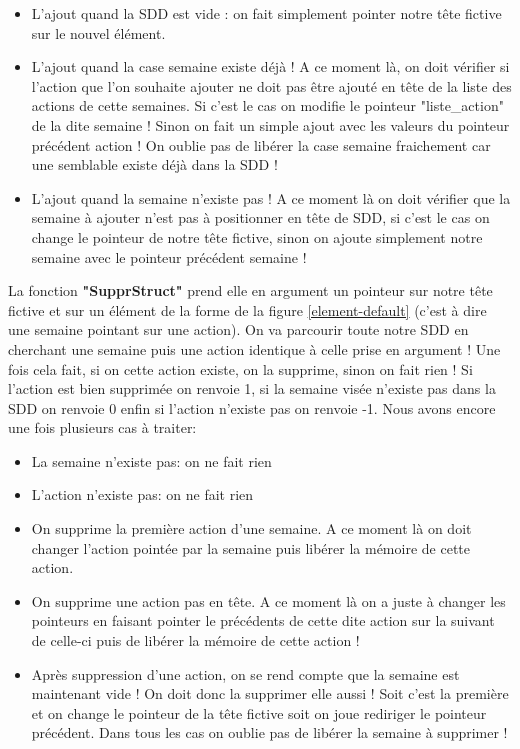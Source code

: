 \documentclass[12pt,french]{article} %
\begin{document}
\begin{itemize}
	\item L'ajout quand la SDD est vide : on fait simplement pointer notre tête fictive sur le nouvel élément.
	\item L'ajout quand la case semaine existe déjà ! A ce moment là, on doit vérifier si l'action que l'on souhaite ajouter ne doit pas être ajouté en tête de la liste des actions de cette semaines. Si c'est le cas on modifie le pointeur "liste\_action" de la dite semaine ! Sinon on fait un simple ajout avec les valeurs du pointeur précédent action ! On oublie pas de libérer la case semaine fraichement car une semblable existe déjà dans la SDD ! 
	\item L'ajout quand la semaine n'existe pas ! A ce moment là on doit vérifier que la semaine à ajouter n'est pas à positionner en tête de SDD, si c'est le cas on change le pointeur de notre tête fictive, sinon on ajoute simplement notre semaine avec le pointeur précédent semaine !\newline
\end{itemize}

La fonction \textbf{"SupprStruct"} prend elle en argument un pointeur sur notre tête fictive et sur un élément de la forme de la figure \ref{element-default} (c'est à dire une semaine pointant sur une action). On va parcourir toute notre SDD en cherchant une semaine puis une action identique à celle prise en argument ! Une fois cela fait, si on cette action existe, on la supprime, sinon on fait rien ! Si l'action est bien supprimée on renvoie 1, si la semaine visée n'existe pas dans la SDD on renvoie 0 enfin si l'action n'existe pas on renvoie -1.  Nous avons encore une fois plusieurs cas à traiter:

\begin{itemize}
	\item La semaine n'existe pas: on ne fait rien
	\item L'action n'existe pas: on ne fait rien
	\item On supprime la première action d'une semaine. A ce moment là on doit changer l'action pointée par la semaine puis libérer la mémoire de cette action.
	\item On supprime une action pas en tête. A ce moment là on a juste à changer les pointeurs en faisant pointer le précédents de cette dite action sur la suivant de celle-ci puis de libérer la mémoire de cette action !
	\item Après suppression d'une action, on se rend compte que la semaine est maintenant vide ! On doit donc la supprimer elle aussi ! Soit c'est la première et on change le pointeur de la tête fictive soit on joue rediriger le pointeur précédent. Dans tous les cas on oublie pas de libérer la semaine à supprimer !\newline
\end{itemize}
\end{document}
